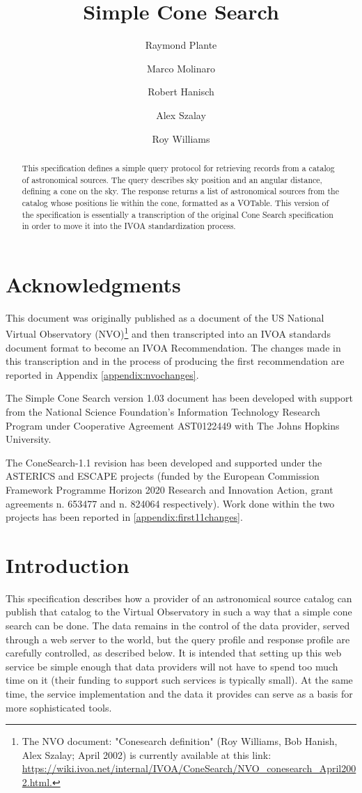 \documentclass[11pt,a4paper]{ivoa}
\title{Simple Cone Search}
\author[http://www.ivoa.net/twiki/bin/view/IVOA/RayPlante]{Raymond Plante}
\author[http://www.ivoa.net/twiki/bin/view/IVOA/MarcoMolinaro]{Marco Molinaro}
\author[http://www.ivoa.net/twiki/bin/view/IVOA/BobHanisch]{Robert Hanisch}
\author[http://www.ivoa.net/twiki/bin/view/IVOA/AlexSzalay]{Alex Szalay}
\author[http://www.ivoa.net/twiki/bin/view/IVOA/RoyWilliams]{Roy Williams}
\begin{document}
\begin{abstract} This specification defines a simple
query protocol for retrieving records from a catalog of astronomical
sources. The query describes sky position and an angular distance,
defining a cone on the sky. The response returns a list of astronomical
sources from the catalog whose positions lie within the cone, formatted
as a VOTable. This version of the specification is essentially a
transcription of the original Cone Search specification in order to move
it into the IVOA standardization process. \end{abstract}


\section*{Acknowledgments} 

This document was originally published as a
document of the US National Virtual Observatory (NVO)\footnote{The NVO
document: "Conesearch definition" (Roy Williams, Bob Hanish, Alex
Szalay; April 2002) is currently available at this link:
\url{https://wiki.ivoa.net/internal/IVOA/ConeSearch/NVO\_conesearch\_April2002.html.}}
and then transcripted into an IVOA standards document format to become
an IVOA Recommendation. The changes made in this transcription and in
the process of producing the first recommendation are reported in
Appendix \ref{appendix:nvochanges}.

The Simple Cone Search version 1.03 document has been developed with
support from the National Science Foundation's Information Technology
Research Program under Cooperative Agreement AST0122449 with The Johns
Hopkins University.

The ConeSearch-1.1 revision has been developed and supported under the
ASTERICS and ESCAPE projects (funded by the European Commission
Framework Programme Horizon 2020 Research and Innovation Action, grant
agreements n. 653477 and n. 824064 respectively). Work done within the
two projects has been reported in \ref{appendix:first11changes}.

\section{Introduction}

This specification describes how a provider of an astronomical source
catalog can publish that catalog to the Virtual Observatory in such a
way that a simple cone search can be done. The data remains in the
control of the data provider, served through a web server to the world,
but the query profile and response profile are carefully controlled, as
described below. It is intended that setting up this web service be
simple enough that data providers will not have to spend too much time
on it (their funding to support such services is typically small). At
the same time, the service implementation and the data it provides can
serve as a basis for more sophisticated tools.
\end{document}
